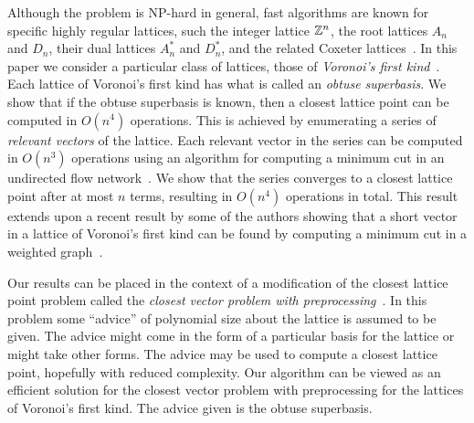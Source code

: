 \documentclass[final,leqno]{siamltex}
\begin{document}
Although the problem is NP-hard in general, fast algorithms are known for specific highly regular lattices, such the integer lattice ${\mathbb Z}^{n}$, the root lattices $A_n$ and $D_n$, their dual lattices $A_n^*$ and $D_n^*$, and the related Coxeter lattices~\cite[Chap.~4]{SPLAG}\cite{Conway1982FastQuantDec, McKilliam2008, McKilliam2009CoxeterLattices}.  In this paper we consider a particular class of lattices, those of \emph{Voronoi's first kind}~\cite{ConwaySloane1992_voronoi_lattice_3d_obtuse_superbases,Valentin2003_coverings_tilings_low_dimension,Voronoi1908_main_paper}.  Each lattice of Voronoi's first kind has what is called an \emph{obtuse superbasis}.  We show that if the obtuse superbasis is known, then a closest lattice point can be computed in $O(n^4)$ operations.  This is achieved by enumerating a series of \emph{relevant vectors} of the lattice.  Each relevant vector in the series can be computed in $O(n^3)$ operations using an algorithm for computing a minimum cut in an undirected flow network~\cite{Picard_min_cuts_1974,Sankaran_solving_CDMA_mincut_1998,Ulukus_cdma_mincut_1998,Cormen2001}.  We show that the series converges to a closest lattice point after at most $n$ terms, resulting in $O(n^4)$ operations in total.  This result extends upon a recent result by some of the authors showing that a short vector in a lattice of Voronoi's first kind can be found by computing a minimum cut in a weighted graph~\cite{McKilliam_short_vectors_first_type_isit_2012}.


Our results can be placed in the context of a modification of the closest lattice point problem called the \emph{closest vector problem with preprocessing}~\cite{micciancio_hardness_2001,feige_inapproximability_2004,Regev_2004_inappox_lattice_with_preprocessing,Aleknovish_hardness_with_preprocessing_2011,knot_hardness_cvvp_2014,Dadush_cvp_with_distance_guarantee_2014}.  In this problem some ``advice'' of polynomial size about the lattice is assumed to be given.  The advice might come in the form of a particular basis for the lattice or might take other forms.  The advice may be used to compute a closest lattice point, hopefully with reduced complexity.  %
Our algorithm can be viewed as an efficient solution for the closest vector problem with preprocessing for the lattices of Voronoi's first kind.  The advice given is the obtuse superbasis. 
\end{document}
